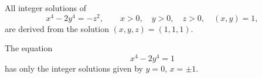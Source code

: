 \begin{proposition}
    All integer solutions of
\[
    x^4-2y^4=-z^2,\qquad x>0,\quad y>0,\quad z>0,\quad (x,y)=1,
\]
    are derived from the solution $(x,y,z)=(1,1,1)$.
\end{proposition}

\begin{proposition}
    The equation
\[
    x^4-2y^4=1
\]
    has only the integer solutions given by $y=0$, $x=\pm1$.
\end{proposition}
